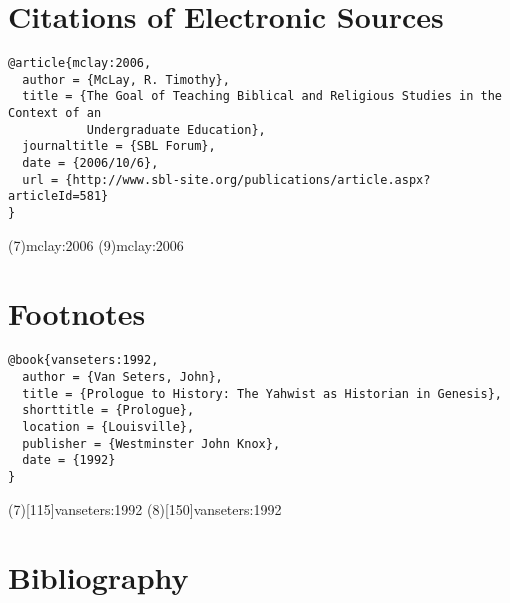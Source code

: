 \documentclass[a4paper]{article}
\begin{document}
\section{Citations of Electronic Sources}

\begin{verbatim}
@article{mclay:2006,
  author = {McLay, R. Timothy},
  title = {The Goal of Teaching Biblical and Religious Studies in the Context of an
           Undergraduate Education},
  journaltitle = {SBL Forum},
  date = {2006/10/6},
  url = {http://www.sbl-site.org/publications/article.aspx?articleId=581}
}
\end{verbatim}

\examplecite(7){mclay:2006}
\examplecite(9){mclay:2006}
\examplebibliography

\section{Footnotes}

\begin{verbatim}
@book{vanseters:1992,
  author = {Van Seters, John},
  title = {Prologue to History: The Yahwist as Historian in Genesis},
  shorttitle = {Prologue},
  location = {Louisville},
  publisher = {Westminster John Knox},
  date = {1992}
}
\end{verbatim}

\examplecite(7)[115]{vanseters:1992}
\examplecite(8)[150]{vanseters:1992}
\examplebibliography

\section{Bibliography}
\end{document}
